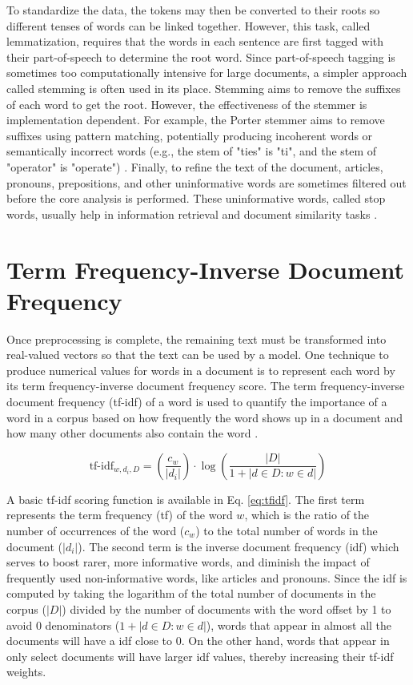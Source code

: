 To standardize the data, the tokens may then be converted to their roots so different tenses of words can be linked together.  However, this task, called lemmatization, requires that the words in each sentence are first tagged with their part-of-speech to determine the root word.  Since part-of-speech tagging is sometimes too computationally intensive for large documents, a simpler approach called stemming is often used in its place.  Stemming aims to remove the suffixes of each word to get the root.  However, the effectiveness of the stemmer is implementation dependent.  For example, the Porter stemmer aims to remove suffixes using pattern matching, potentially producing incoherent words or semantically incorrect words (e.g., the stem of "ties" is "ti", and the stem of "operator" is "operate") \cite{porterStemmer}.  Finally, to refine the text of the document, articles, pronouns, prepositions, and other uninformative words are sometimes filtered out before the core analysis is performed.  These uninformative words, called stop words, usually help in information retrieval and document similarity tasks \cite{stopWord}.


\section{Term Frequency-Inverse Document Frequency} \label{tfidfSection}

Once preprocessing is complete, the remaining text must be transformed into real-valued vectors so that the text can be used by a model.  One technique to produce numerical values for words in a document is to represent each word by its term frequency-inverse document frequency score.  The term frequency-inverse document frequency (tf-idf) of a word is used to quantify the importance of a word in a corpus based on how frequently the word shows up in a document and how many other documents also contain the word \cite{tfidf}.

\begin{equation}
\label{eq:tfidf}
\mbox{tf-idf}_{w,d_{i},D} = ( \frac{c_{w}}{|d_{i}|} ) \cdot \log ( \frac{|D|}{1 + |d  \in  D : w  \in  d|} ) 
\end{equation}

A basic tf-idf scoring function is available in Eq. \ref{eq:tfidf}.  The first term represents the term frequency (tf) of the word $w$, which is the ratio of the number of occurrences of the word ($c_{w}$) to the total number of words in the document ($|d_{i}|$).  The second term is the inverse document frequency (idf) which serves to boost rarer, more informative words, and diminish the impact of frequently used non-informative words, like articles and pronouns.  Since the idf is computed by taking the logarithm of the total number of documents in the corpus ($|D|$) divided by the number of documents with the word offset by 1 to avoid 0 denominators ($1 + |d  \in  D : w  \in  d|$), words that appear in almost all the documents will have a idf close to 0.  On the other hand, words that appear in only select documents will have larger idf values, thereby increasing their tf-idf weights.

